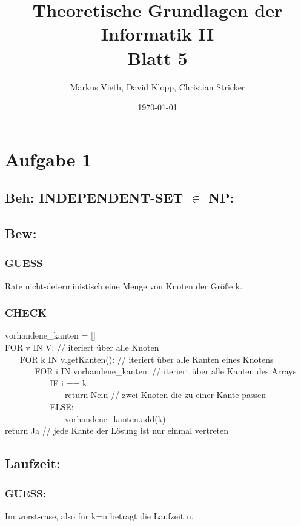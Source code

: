 \documentclass[a4paper,11pt,twoside]{article}
\title{Theoretische Grundlagen der Informatik II\\ Blatt 5}
\author{Markus Vieth, David Klopp, Christian Stricker}
\date{\today}
\newcommand{\green}[1]{\textcolor{command_green}{#1}}
\begin{document}
\maketitle
\cleardoublepage
\pagestyle{myheadings}

\section*{Aufgabe 1}
\subsection*{Beh: INDEPENDENT-SET $\in$ NP:}
\subsection*{Bew:}
\subsubsection*{GUESS}
Rate nicht-deterministisch eine Menge von Knoten der Größe k.

\subsubsection*{CHECK}
vorhandene\_kanten = []\\
FOR v IN V: \green{// iteriert über alle Knoten} \\
$~~~~~~~~$FOR k IN v.getKanten(): \green{// iteriert über alle Kanten eines Knotens} \\
$~~~~~~~~~~~~~~~~$FOR i IN vorhandene\_kanten: \green{// iteriert über alle Kanten des Arrays}\\
$~~~~~~~~~~~~~~~~~~~~~~~~$IF i == k: \\
$~~~~~~~~~~~~~~~~~~~~~~~~~~~~~~~~$return Nein \green{// zwei Knoten die zu einer Kante passen} \\
$~~~~~~~~~~~~~~~~~~~~~~~~$ELSE:\\
$~~~~~~~~~~~~~~~~~~~~~~~~~~~~~~~~$vorhandene\_kanten.add(k) \\
return Ja \green{// jede Kante der Lösung ist nur einmal vertreten}


\subsection*{Laufzeit:}
\subsubsection*{GUESS:}
Im worst-case, also für k=n beträgt die Laufzeit n.
\end{document}

